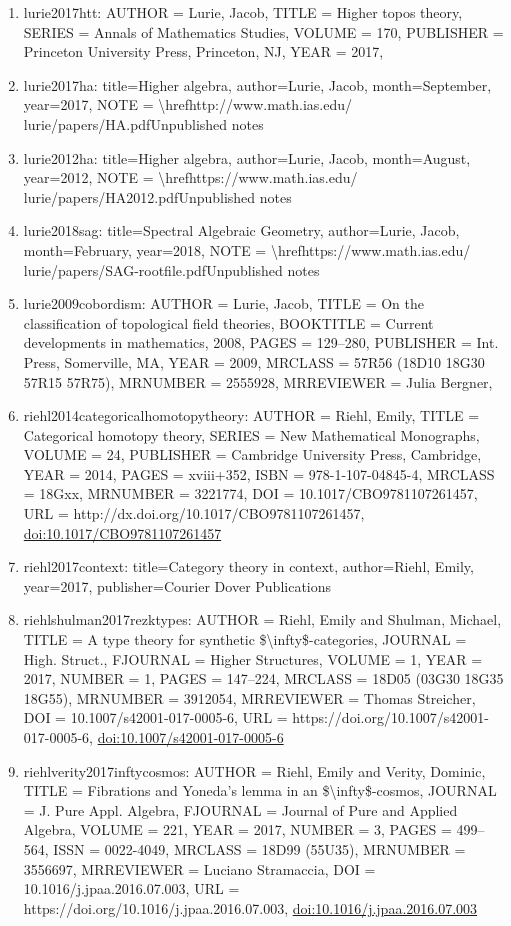 \documentclass[11pt]{article}
\begin{document}
\begin{enumerate}[leftmargin=*]
  \item lurie2017htt: AUTHOR = Lurie, Jacob, TITLE = Higher topos theory, SERIES = Annals of Mathematics Studies, VOLUME = 170, PUBLISHER = Princeton University Press, Princeton, NJ, YEAR = 2017,
  \item lurie2017ha: title=Higher algebra, author=Lurie, Jacob, month=September, year=2017, NOTE = \textbackslash{}hrefhttp://www.math.ias.edu/ lurie/papers/HA.pdfUnpublished notes
  \item lurie2012ha: title=Higher algebra, author=Lurie, Jacob, month=August, year=2012, NOTE = \textbackslash{}hrefhttps://www.math.ias.edu/ lurie/papers/HA2012.pdfUnpublished notes
  \item lurie2018sag: title=Spectral Algebraic Geometry, author=Lurie, Jacob, month=February, year=2018, NOTE = \textbackslash{}hrefhttps://www.math.ias.edu/ lurie/papers/SAG-rootfile.pdfUnpublished notes
  \item lurie2009cobordism: AUTHOR = Lurie, Jacob, TITLE = On the classification of topological field theories, BOOKTITLE = Current developments in mathematics, 2008, PAGES = 129--280, PUBLISHER = Int. Press, Somerville, MA, YEAR = 2009, MRCLASS = 57R56 (18D10 18G30 57R15 57R75), MRNUMBER = 2555928, MRREVIEWER = Julia Bergner,
  \item riehl2014categoricalhomotopytheory: AUTHOR = Riehl, Emily, TITLE = Categorical homotopy theory, SERIES = New Mathematical Monographs, VOLUME = 24, PUBLISHER = Cambridge University Press, Cambridge, YEAR = 2014, PAGES = xviii+352, ISBN = 978-1-107-04845-4, MRCLASS = 18Gxx, MRNUMBER = 3221774, DOI = 10.1017/CBO9781107261457, URL = http://dx.doi.org/10.1017/CBO9781107261457, \href{https://doi.org/10.1017/CBO9781107261457}{doi:10.1017/CBO9781107261457}
  \item riehl2017context: title=Category theory in context, author=Riehl, Emily, year=2017, publisher=Courier Dover Publications
  \item riehlshulman2017rezktypes: AUTHOR = Riehl, Emily and Shulman, Michael, TITLE = A type theory for synthetic \$\textbackslash{}infty\$-categories, JOURNAL = High. Struct., FJOURNAL = Higher Structures, VOLUME = 1, YEAR = 2017, NUMBER = 1, PAGES = 147--224, MRCLASS = 18D05 (03G30 18G35 18G55), MRNUMBER = 3912054, MRREVIEWER = Thomas Streicher, DOI = 10.1007/s42001-017-0005-6, URL = https://doi.org/10.1007/s42001-017-0005-6, \href{https://doi.org/10.1007/s42001-017-0005-6}{doi:10.1007/s42001-017-0005-6}
  \item riehlverity2017inftycosmos: AUTHOR = Riehl, Emily and Verity, Dominic, TITLE = Fibrations and Yoneda's lemma in an \$\textbackslash{}infty\$-cosmos, JOURNAL = J. Pure Appl. Algebra, FJOURNAL = Journal of Pure and Applied Algebra, VOLUME = 221, YEAR = 2017, NUMBER = 3, PAGES = 499--564, ISSN = 0022-4049, MRCLASS = 18D99 (55U35), MRNUMBER = 3556697, MRREVIEWER = Luciano Stramaccia, DOI = 10.1016/j.jpaa.2016.07.003, URL = https://doi.org/10.1016/j.jpaa.2016.07.003, \href{https://doi.org/10.1016/j.jpaa.2016.07.003}{doi:10.1016/j.jpaa.2016.07.003}

\end{enumerate}
\end{document}
